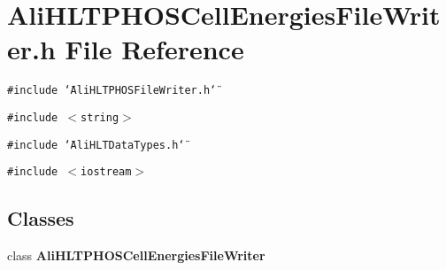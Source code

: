 \section{Ali\-HLTPHOSCell\-Energies\-File\-Writer.h File Reference}
\label{AliHLTPHOSCellEnergiesFileWriter_8h}


{\tt \#include \char`\"{}Ali\-HLTPHOSFile\-Writer.h\char`\"{}}\par
{\tt \#include $<$string$>$}\par
{\tt \#include \char`\"{}Ali\-HLTData\-Types.h\char`\"{}}\par
{\tt \#include $<$iostream$>$}\par
\subsection*{Classes}
\begin{CompactItemize}
\item 
class {\bf Ali\-HLTPHOSCell\-Energies\-File\-Writer}
\end{CompactItemize}
